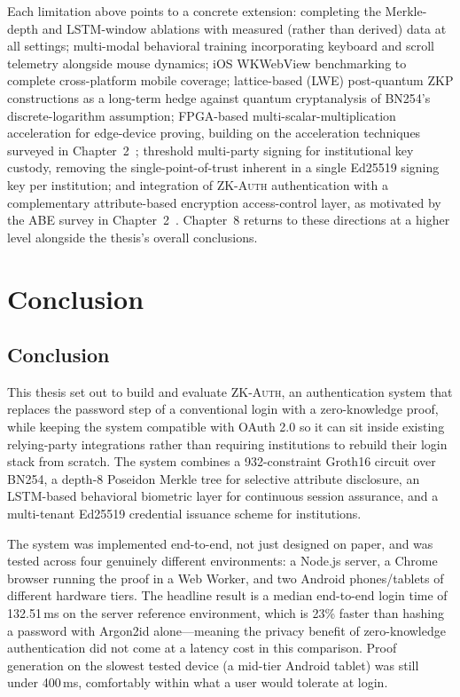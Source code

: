 \documentclass[12pt,a4paper,oneside]{report}
\begin{document}
Each limitation above points to a concrete extension: completing the
Merkle-depth and LSTM-window ablations with measured (rather than
derived) data at all settings; multi-modal behavioral training
incorporating keyboard and scroll telemetry alongside mouse dynamics;
iOS WKWebView benchmarking to complete cross-platform mobile coverage;
lattice-based (LWE) post-quantum ZKP constructions as a long-term hedge
against quantum cryptanalysis of BN254's discrete-logarithm assumption;
FPGA-based multi-scalar-multiplication acceleration for edge-device
proving, building on the acceleration techniques surveyed in
Chapter~2~\cite{butt2024}; threshold multi-party signing for
institutional key custody, removing the single-point-of-trust inherent
in a single Ed25519 signing key per institution; and integration of
\textsc{ZK-Auth} authentication with a complementary attribute-based
encryption access-control layer, as motivated by the ABE survey in
Chapter~2~\cite{prasad2025abereview}. Chapter~8 returns to these
directions at a higher level alongside the thesis's overall conclusions.

\chapter{Conclusion}

\section{Conclusion}

This thesis set out to build and evaluate \textsc{ZK-Auth}, an
authentication system that replaces the password step of a conventional
login with a zero-knowledge proof, while keeping the system compatible
with OAuth 2.0 so it can sit inside existing relying-party integrations
rather than requiring institutions to rebuild their login stack from
scratch. The system combines a 932-constraint Groth16 circuit over
BN254, a depth-8 Poseidon Merkle tree for selective attribute disclosure,
an LSTM-based behavioral biometric layer for continuous session
assurance, and a multi-tenant Ed25519 credential issuance scheme for
institutions.

The system was implemented end-to-end, not just designed on paper, and
was tested across four genuinely different environments: a Node.js
server, a Chrome browser running the proof in a Web Worker, and two
Android phones/tablets of different hardware tiers. The headline result
is a median end-to-end login time of 132.51\,ms on the server
reference environment, which is 23\% faster than hashing a password with
Argon2id alone---meaning the privacy benefit of zero-knowledge
authentication did not come at a latency cost in this comparison. Proof
generation on the slowest tested device (a mid-tier Android tablet) was
still under 400\,ms, comfortably within what a user would tolerate at
login.
\end{document}
